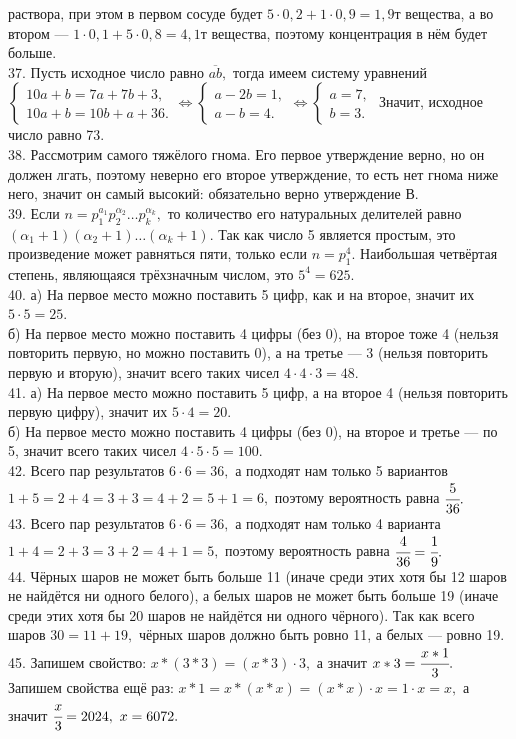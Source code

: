 \documentclass[12pt]{article}
\begin{document}
раствора, при этом в первом сосуде будет $5\cdot0,2+1\cdot0,9=1,9$т вещества, а во втором --- $1\cdot0,1+5\cdot0,8=4,1$т вещества, поэтому концентрация в нём будет больше.\\
37. Пусть исходное число равно $\overline{ab},$ тогда имеем систему уравнений $\begin{cases}10a+b=7a+7b+3,\\ 10a+b=10b+a+36.\end{cases}\Leftrightarrow
\begin{cases}a-2b=1,\\ a-b=4.\end{cases}\Leftrightarrow
\begin{cases}a=7,\\ b=3.\end{cases}$ Значит, исходное число равно 73.\\
38. Рассмотрим самого тяжёлого гнома. Его первое утверждение верно, но он должен лгать, поэтому неверно его второе утверждение, то есть нет гнома ниже него, значит он самый высокий: обязательно верно утверждение В.\\
39. Если $n=p_1^{a_1}p_2^{\alpha_2}\ldots p_k^{\alpha_k},$ то количество его натуральных делителей равно $(\alpha_1+1)(\alpha_2+1)\ldots (\alpha_k+1).$ Так как число 5 является простым, это произведение может равняться пяти, только если $n=p_1^4.$ Наибольшая четвёртая степень, являющаяся трёхзначным числом, это $5^4=625.$\\
40. а) На первое место можно поставить 5 цифр, как и на второе, значит их $5\cdot5=25.$\\
б) На первое место можно поставить 4 цифры (без 0), на второе тоже 4 (нельзя повторить первую, но можно поставить 0), а на третье --- 3 (нельзя повторить первую и вторую), значит всего таких чисел $4\cdot4\cdot3=48.$\\
41. а) На первое место можно поставить 5 цифр, а на второе 4 (нельзя повторить первую цифру), значит их $5\cdot4=20.$\\
б) На первое место можно поставить 4 цифры (без 0), на второе и третье --- по 5, значит всего таких чисел $4\cdot5\cdot5=100.$\\
42. Всего пар результатов $6\cdot6=36,$ а подходят нам только 5 вариантов $1+5=2+4=3+3=4+2=5+1=6,$ поэтому вероятность равна $\cfrac{5}{36}.$\\
43. Всего пар результатов $6\cdot6=36,$ а подходят нам только 4 варианта $1+4=2+3=3+2=4+1=5,$ поэтому вероятность равна $\cfrac{4}{36}=\cfrac{1}{9}.$\\
44. Чёрных шаров не может быть больше 11 (иначе среди этих хотя бы 12 шаров не найдётся ни одного белого), а белых шаров не может быть больше 19 (иначе среди этих хотя бы 20 шаров не найдётся ни одного чёрного). Так как всего шаров $30=11+19,$ чёрных шаров должно быть ровно 11, а белых --- ровно 19.\\
45. Запишем свойство: $x*(3*3)=(x*3)\cdot3,$ а значит $x*3=\cfrac{x*1}{3}.$ Запишем свойства ещё раз: $x*1=x*(x*x)=(x*x)\cdot x=1\cdot x=x,$ а значит
$\cfrac{x}{3}=2024,\ x=6072.$
\newpage
\end{document}

